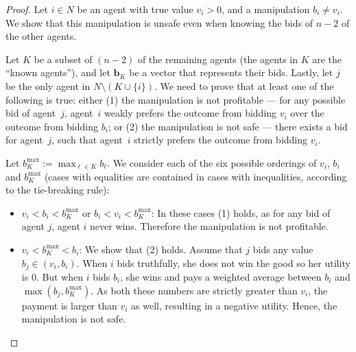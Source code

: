 \begin{proof}
Let $i\in N$ be an agent with true value $v_i>0$, and a manipulation $b_i \neq v_i$. We show that this manipulation is unsafe even when knowing the bids of $n-2$ of the other agents.

Let $K$ be a subset of $(n-2)$ of the remaining agents (the agents in $K$ are the ``known agents''), and let $\mathbf{b}_{K}$ be a vector that represents their bids.
Lastly, let $j$ be the only agent in $N\setminus (K\cup \{i\})$.
We need to prove that at least one of the following is true: either (1) the manipulation is not profitable --- for any possible bid of agent~$j$, agent~$i$ weakly prefers the outcome from bidding $v_i$ 
over the outcome from bidding $b_i$;
or (2) the manipulation is not safe --- there exists a bid for agent~$j$, such that agent~$i$ strictly prefers the outcome from bidding $v_i$.

Let $\displaystyle b^{\max}_{K} := \max_{\ell\in K}b_{\ell}$.
We consider each of the six possible orderings of $v_i$, $b_i$ and $b^{\max}_{K}$ (cases with equalities are contained in cases with inequalities, according to the tie-breaking rule):


\begin{itemize}
    \item 
    $v_i < b_i < b^{\max}_{K}$ or $b_i < v_i < b^{\max}_{K}$:  
    In these cases (1) holds, as for any bid of agent $j$, agent $i$ never wins. Therefore the manipulation is not profitable.
    
    \item 
    $v_i < b^{\max}_{K} < b_i$:
We show that (2) holds. Assume that $j$ bids any value $b_j \in (v_i, b_i)$.
When $i$ bids truthfully, she does not win the good so her utility is $0$.
But when $i$ bids $b_i$, she wins and pays a weighted average between $b_i$ and $\max(b_j, b_K^{\max})$. As both these numbers are strictly greater than $v_i$, the payment is larger than $v_i$ as well, resulting in a negative utility. Hence, the manipulation is not safe.
    

\end{itemize}
\end{proof}
